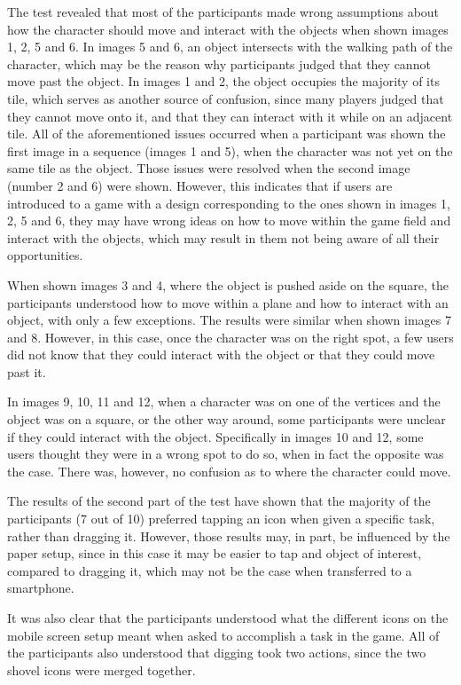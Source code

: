The test revealed that most of the participants made wrong assumptions about how the character should move and interact with the objects when shown images 1, 2, 5 and 6. In images 5 and 6, an object intersects with the walking path of the character, which may be the reason why participants judged that they cannot move past the object. In images 1 and 2, the object occupies the majority of its tile, which serves as another source of confusion, since many players judged that they cannot move onto it, and that they can interact with it while on an adjacent tile. All of the aforementioned issues occurred when a participant was shown the first image in a sequence (images 1 and 5), when the character was not yet on the same tile as the object. Those issues were resolved when the second image (number 2 and 6) were shown. However, this indicates that if users are introduced to a game with a design corresponding to the ones shown in images 1, 2, 5 and 6, they may have wrong ideas on how to move within the game field and interact with the objects, which may result in them not being aware of all their opportunities.

When shown images 3 and 4, where the object is pushed aside on the square, the participants understood how to move within a plane and how to interact with an object, with only a few exceptions. The results were similar when shown images 7 and 8. However, in this case, once the character was on the right spot, a few users did not know that they could interact with the object or that they could move past it. 

In images 9, 10, 11 and 12, when a character was on one of the vertices and the object was on a square, or the other way around, some participants were unclear if they could interact with the object. Specifically in images 10 and 12, some users thought they were in a wrong spot to do so, when in fact the opposite was the case. There was, however, no confusion as to where the character could move.

The results of the second part of the test have shown that the majority of the participants (7 out of 10) preferred tapping an icon when given a specific task, rather than dragging it. However, those results may, in part, be influenced by the paper setup, since in this case it may be easier to tap and object of interest, compared to dragging it, which may not be the case when transferred to a smartphone. 

It was also clear that the participants understood what the different icons on the mobile screen setup meant when asked to accomplish a task in the game. All of the participants also understood that digging took two actions, since the two shovel icons were merged together. 


